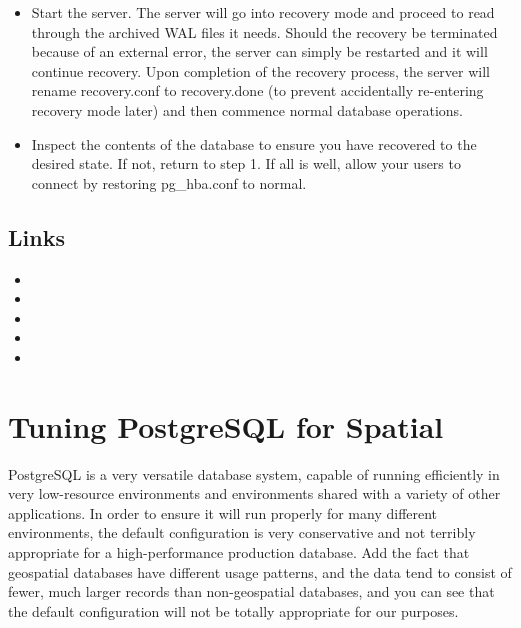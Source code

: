 \documentclass[a4paper,11pt,english]{sphinxmanual}
\begin{document}
\begin{itemize}
\item {} 
Start the server. The server will go into recovery mode and proceed to read through the archived WAL files it needs. Should the recovery be terminated because of an external error, the server can simply be restarted and it will continue recovery. Upon completion of the recovery process, the server will rename recovery.conf to recovery.done (to prevent accidentally re-entering recovery mode later) and then commence normal database operations.

\item {} 
Inspect the contents of the database to ensure you have recovered to the desired state. If not, return to step 1. If all is well, allow your users to connect by restoring pg\_hba.conf to normal.

\end{itemize}


\subsection{Links}
\label{\detokenize{maintenance:id3}}\begin{itemize}
\item {} 

\item {} 

\item {} 

\item {} 

\item {} 

\end{itemize}


\section{Tuning PostgreSQL for Spatial}
\label{\detokenize{maintenance:tuning-postgresql-for-spatial}}\label{\detokenize{maintenance:tuning}}
PostgreSQL is a very versatile database system, capable of running efficiently in very low-resource environments and environments shared with a variety of other applications.  In order to ensure it will run properly for many different environments, the default configuration is very conservative and not terribly appropriate for a high-performance production database.  Add the fact that geospatial databases have different usage patterns, and the data tend to consist of fewer, much larger records than non-geospatial databases, and you can see that the default configuration will not be totally appropriate for our purposes.
\end{document}
